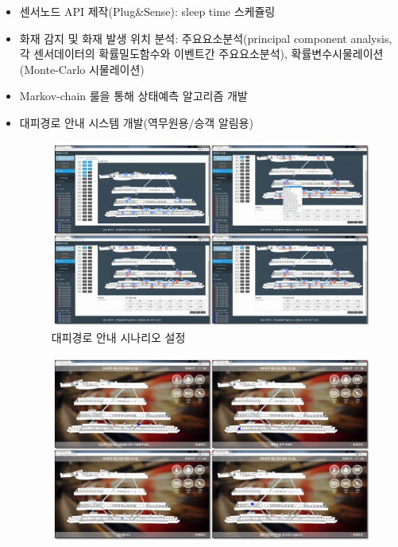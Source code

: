 \begin{itemize}[label=]
\begin{itemize}[label=]
\begin{figure}[!ht]
\begin{fullwidth}
			            \end{fullwidth}
		            \end{figure}
		      \item 센서노드 API 제작(Plug\&Sense): sleep time 스케쥴링
		      \item 화재 감지 및 화재 발생 위치 분석: 주요요소분석(principal component analysis, 각 센서데이터의 확률밀도함수와 이벤트간 주요요소분석), 확률변수시물레이션(Monte-Carlo 시물레이션)
		      \item Markov-chain 룰을 통해 상태예측 알고리즘 개발
		      \item 대피경로 안내 시스템 개발(역무원용/승객 알림용)
		            \begin{figure}[ht!]
			            \begin{fullwidth}
				            \centering
				            \includegraphics[width=1.2\textwidth]{images/m2m_03.png}
				            \caption*{대피경로 안내 시나리오 설정}
			            \end{fullwidth}
		            \end{figure}
		            \begin{figure}[ht!]
			            \begin{fullwidth}
				            \centering
				            \includegraphics[width=1.2\textwidth]{images/m2m_04.png}

\end{fullwidth}
\end{figure}
\end{itemize}
\end{itemize}
